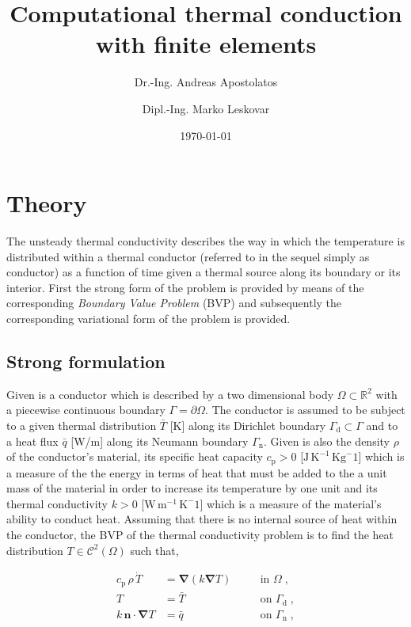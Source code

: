 \documentclass[10pt,a4paper]{article}
\title{Computational thermal conduction with finite elements}
\author{Dr.-Ing. Andreas Apostolatos \and Dipl.-Ing. Marko Leskovar}
\date{\today}
\begin{document}
\maketitle

\section{Theory}\label{sec:theory}

The unsteady thermal conductivity describes the way in which the temperature is distributed within a thermal conductor (referred to in the sequel simply as conductor) as a function of time given a thermal source along its boundary or its interior. First the strong form of the problem is provided by means of the corresponding \textit{Boundary Value Problem} (BVP) and subsequently the corresponding variational form of the problem is provided.

\subsection{Strong formulation}\label{subsec:strong_formulation}

Given is a conductor which is described by a two dimensional body $\Omega \subset \mathbb{R}^2$ with a piecewise continuous boundary $\Gamma = \partial \Omega$. The conductor is assumed to be subject to a given thermal distribution $\bar{T}$ [K] along its Dirichlet boundary $\Gamma_{\text{d}} \subset \Gamma$ and to a heat flux $\bar{q}$ [W/m] along its Neumann boundary $\Gamma_{\text{n}}$. Given is also the density $\rho$ of the conductor's material, its specific heat capacity $c_{\text{p}} > 0$ [$\text{J} \, \text{K}^{-1} \, \text{Kg}^-1$] which is a measure of the the energy in terms of heat that must be added to the a unit mass of the material in order to increase its temperature by one unit and its thermal conductivity $k > 0$ [$\text{W} \, \text{m}^{-1} \, \text{K}^-1$] which is a measure of the material's ability to conduct heat. Assuming that there is no internal source of heat within the conductor, the BVP of the thermal conductivity problem is to find the heat distribution $T \in \mathcal{C}^2(\Omega)$ such that,

\begin{subequations}
	\begin{alignat}{2}
		c_{\text{p}} \, \rho \, \dot{T} &= \boldsymbol{\nabla} (k\boldsymbol{\nabla} T) \quad &&\text{in }\Omega\;, \label{eq:thermal_conduction} \\
		T &= \bar{T} \; &&\text{on } \Gamma_{\text{d}} \;, \label{eq:boundary_dirichlet} \\
		k \, \mathbf{n} \cdot \boldsymbol{\nabla} T &= \bar{q} \label{eq:boundary_flux} \; &&\text{on } \Gamma_{\text{n}} \;,
	\end{alignat}
	\label{eq:thermal_conduction_bvp}
\end{subequations}
\end{document}
